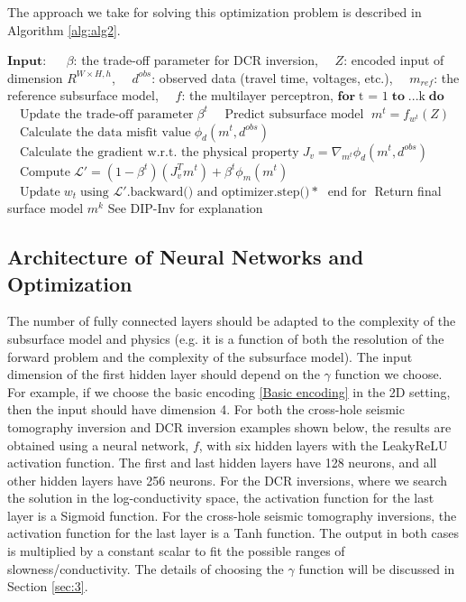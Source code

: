 \documentclass[lettersize,journal]{IEEEtran}
\begin{document}
The approach we take for solving this optimization problem is described in Algorithm \ref{alg:alg2}.
\begin{algorithm}
\caption{NFs-Inv algorithm.}
\label{alg:alg2}
\begin{algorithmic}
\State 
\State $\textbf{Input:}\;$ 
\State $\quad \beta$: the trade-off parameter for DCR inversion, 
\State $\quad Z$: encoded input of dimension $R^{W \times H, h}$, 
\State $\quad d^{obs}$: observed data (travel time, voltages, etc.), 
\State $\quad m_{ref}$: the reference subsurface model, \State $\quad f$: the multilayer perceptron,
\State $\textbf{for}\; \textrm{t = 1}\; \textbf{to}\; \textrm{...k}\; \textbf{do}$
\State $\quad\textrm{Update the trade-off parameter}\; \beta^t$
\State $\quad\textrm{Predict subsurface model }\; m^t = f_{w^t} (Z)$
\State $\quad\textrm{Calculate the data misfit value}\; \phi_{d}(m^t, d^{obs})$
\State $\quad\textrm{Calculate the gradient w.r.t. the physical property}\; J_v = \nabla_{m^t} \phi_{d}(m^t, d^{obs})$
\State $\quad\textrm{Compute}\;\mathcal{L'} =(1-\beta^t)(J_v^T m^t) + \beta^t \phi_{m}(m^t)$
\State $\quad\textrm{Update}\; w_t \; \textrm{using } \mathcal{L'.}\textrm{backward() and optimizer.step()} *\;$
\State $\textrm{end for}\;$
\State Return final surface model $m^k$
\State *See DIP-Inv \cite{27} for explanation
\end{algorithmic}
\end{algorithm}

\subsection{Architecture of Neural Networks and Optimization}

The number of fully connected layers should be adapted to the complexity of the subsurface model and physics (e.g. it is a function of both the resolution of the forward problem and the complexity of the subsurface model). The input dimension of the first hidden layer should depend on the $\gamma$ function we choose. For example, if we choose the basic encoding \ref{Basic encoding} in the 2D setting, then the input should have dimension 4. For both the cross-hole seismic tomography inversion and DCR inversion examples shown below, the results are obtained using a neural network, $f$, with six hidden layers with the LeakyReLU activation function. The first and last hidden layers have 128 neurons, and all other hidden layers have 256 neurons. For the DCR inversions, where we search the solution in the log-conductivity space, the activation function for the last layer is a Sigmoid function. For the cross-hole seismic tomography inversions, the activation function for the last layer is a Tanh function. The output in both cases is multiplied by a constant scalar to fit the possible ranges of slowness/conductivity. The details of choosing the $\gamma$ function will be discussed in Section \ref{sec:3}. 
\end{document}
